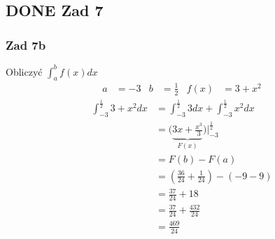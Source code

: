 \documentclass[11pt]{article}
\begin{document}
\subsection{{\bfseries\sffamily DONE} Zad 7}
\label{sec:org1e4624a}
\subsubsection{Zad 7b}
\label{sec:orgf055211}
Obliczyć \(\displaystyle\int_a^b f(x) dx\)
\begin{align*}
a &= -3 & b &= \frac{1}{2} & f(x)&=3+x^2
\end{align*}
\begin{align*}
  \int_{-3}^\frac{1}{2} 3 + x^2 dx
  &= \int_{-3}^{\frac{1}{2}}3 dx + \int_{-3}^{\frac{1}{2}} x^{2} dx
  \\
  &= \Big ( \underbrace{ 3x + \frac{x^{3}}{3} }_{F(x)} \Big) \Bigg|_{-3}^{\frac{1}{2}}
  \\
  &= F(b) - F(a)
  \\
  &= \left(\frac{36}{24} + \frac{1}{24} \right) - (-9 -9)
  \\
  &= \frac{37}{24} + 18
  \\
  &= \frac{37}{24} + \frac{432}{24}
  \\
  &=\frac{469}{24}
\end{align*}
\end{document}
